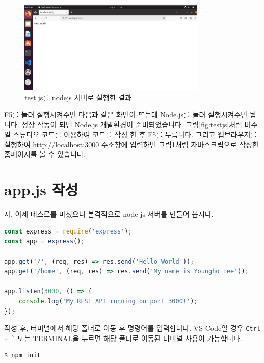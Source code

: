 \documentclass{article}
\begin{document}
\begin{figure}[htb]
  \centering
  \includegraphics[width=0.8\textwidth]{images/helloworld.png}
  \caption{test.js를 nodejs 서버로 실행한 결과}
  \label{fig:testjsresult}
\end{figure}



F5를 눌러 실행시켜주면 다음과 같은 화면이 뜨는데 Node.js를 눌러 실행시켜주면 됩니다. 정상 작동이 되면 Node.js 개발환경이 준비되었습니다. 그림\ref{fig:testjs}처럼 비주얼 스튜디오 코드를 이용하여 코드를 작성 한 후 F5를 누릅니다. 그리고 웹브라우저를 실행하여 http://localhost:3000 주소창에 입력하면 그림\ref{fig:testjsresult}처럼 자바스크립으로 작성한 홈페이지를 볼 수 있습니다. 

\newpage

\section{app.js 작성}
자, 이제 테스르를 마쳤으니 본격적으로 node js 서버를 만들어 봅시다. 

\begin{lstlisting}[language=JavaScript, caption={app.js 예제}]
const express = require('express');
const app = express();

app.get('/', (req, res) => res.send('Hello World'));
app.get('/home', (req, res) => res.send('My name is Youngho Lee'));

app.listen(3000, () => {
    console.log('My REST API running on port 3000!');
});
\end{lstlisting}

작성 후, 터미널에서 해당 폴더로 이동 후 명령어를 입력합니다. VS Code일 경우 \texttt{Ctrl + \`} 또는 TERMINAL을 누르면 해당 폴더로 이동된 터미널 사용이 가능합니다.

\begin{lstlisting}[language=Shell, caption={npm 초기화 명령어}]
$ npm init
\end{lstlisting}
\end{document}
